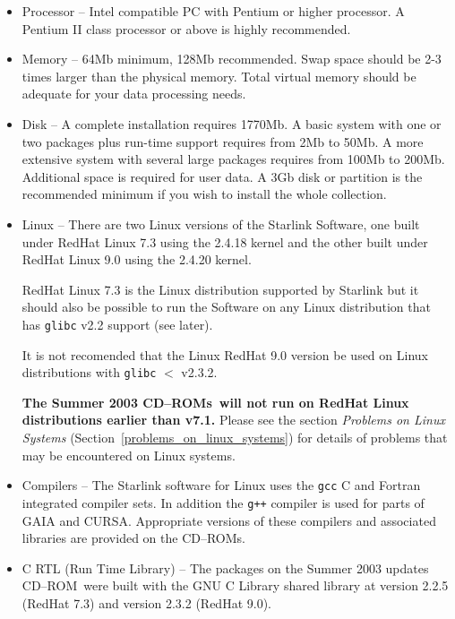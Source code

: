 \documentclass[twoside,11pt]{article}
\newcommand{\htmlref}[2]{#1}
\newcommand{\latex}[1]{#1}
\renewcommand{\_}{\texttt{\symbol{95}}}
\newcommand{\cdrom}{CD--ROM}
\newcommand{\cdrom}{CD-ROM}
\newcommand{\cdroms}{CD--ROMs}
\newcommand{\cdroms}{CD-ROMs}
\newcommand{\rhafull}{1770Mb}
\begin{document}
\begin{itemize}

\item Processor -- Intel compatible PC with Pentium or higher
processor.  A Pentium II class processor or above is highly recommended.

\item Memory -- 64Mb minimum, 128Mb recommended.  Swap space should be
2-3 times larger than the physical memory. Total virtual memory should be
adequate for your data processing needs.

\item Disk -- A complete installation requires \rhafull.
A basic system with one or two packages plus run-time support requires
from 2Mb to 50Mb.  A more extensive system with several large packages
requires from 100Mb to 200Mb.   Additional space is required for user
data.  A 3Gb disk or partition is the recommended minimum if you wish
to install the whole collection.

\item Linux -- There are two Linux versions of the Starlink Software,
one built under RedHat Linux 7.3 using the 2.4.18 kernel and the other
built under RedHat Linux 9.0 using the 2.4.20 kernel.

RedHat Linux 7.3 is the Linux distribution supported by Starlink but it
should also be possible to run the Software on any Linux distribution
that has \texttt{glibc} v2.2 support (see later).

It is not recomended that the Linux RedHat 9.0 version be used
on Linux distributions with  \texttt{glibc} $<$ v2.3.2.

\textbf{The Summer 2003 \cdroms\ will not run on RedHat Linux
distributions earlier than v7.1.} Please see the section
\htmlref{\textit{Problems on Linux Systems}}{problems_on_linux_systems}
\latex{(Section~\ref{problems_on_linux_systems})} for details of problems
that may be encountered on Linux systems.

\item Compilers -- The Starlink software for Linux uses the
\texttt{gcc} C and Fortran integrated compiler sets.  In addition the
\texttt{g++} compiler is used for parts of GAIA and CURSA.  Appropriate
versions of these compilers and associated libraries are provided on
the \cdroms.

\item C RTL (Run Time Library) -- The packages on the Summer 2003
updates \cdrom\ were built with the GNU C Library shared library at
version 2.2.5 (RedHat 7.3) and version 2.3.2 (RedHat 9.0).

\end{itemize}
\end{document}
